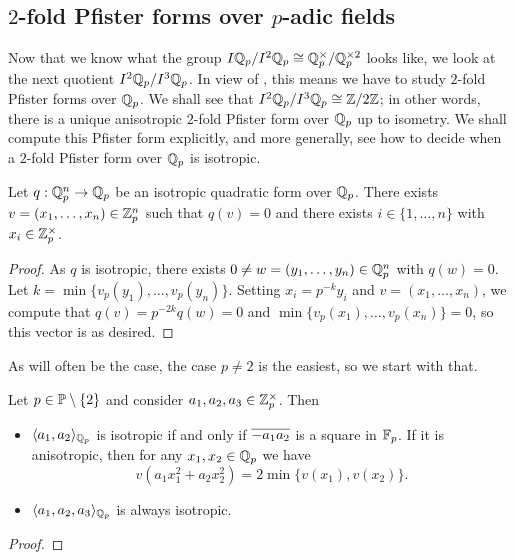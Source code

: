 \documentclass[12pt, leqno, british]{amsart}
\begin{document}
\subsection{$2$-fold Pfister forms over $p$-adic fields}
Now that we know what the group $I\mathbb Q_p/I^2\mathbb Q_p \cong \mathbb Q_p^\times/\mathbb Q_p^{\times 2}$ looks like, we look at the next quotient $I^2\mathbb Q_p/I^3\mathbb Q_p$.
In view of , this means we have to study $2$-fold Pfister forms over $\mathbb Q_p$.
We shall see that $I^2\mathbb Q_p/I^3\mathbb Q_p \cong \mathbb Z/2\mathbb Z$; in other words, there is a unique anisotropic $2$-fold Pfister form over $\mathbb Q_p$ up to isometry.
We shall compute this Pfister form explicitly, and more generally, see how to decide when a $2$-fold Pfister form over $\mathbb Q_p$ is isotropic.

\begin{lem}\label{L:isotropic-vector-in-zzp}
Let $q : \mathbb Q_p^n \to \mathbb Q_p$ be an isotropic quadratic form over $\mathbb Q_p$.
There exists $v = (x_1, \ldots, x_n) \in \mathbb Z_p^n$ such that $q(v) = 0$ and there exists $i \in \lbrace 1, \ldots, n \rbrace$ with $x_i \in \mathbb Z_p^\times$.
\end{lem}
\begin{proof}
As $q$ is isotropic, there exists $0 \neq w = (y_1, \ldots, y_n) \in \mathbb Q_p^n$ with $q(w) = 0$.
Let $k = \min \lbrace v_p(y_1), \ldots, v_p(y_n) \rbrace$.
Setting $x_i = p^{-k}y_i$ and $v = (x_1, \ldots, x_n)$, we compute that $q(v) = p^{-2k}q(w) = 0$ and $\min \lbrace v_p(x_1), \ldots, v_p(x_n) \rbrace = 0$, so this vector is as desired.
\end{proof}
As will often be the case, the case $p\neq 2$ is the easiest, so we start with that.
\begin{lem}
Let $p \in \mathbb P \setminus \lbrace 2 \rbrace$ and consider $a_1, a_2, a_3 \in \mathbb Z_p^\times$.
Then
\begin{itemize}
\item $\langle a_1, a_2 \rangle_{\mathbb Q_p}$ is isotropic if and only if $\overline{-a_1a_2}$ is a square in $\mathbb F_p$.
If it is anisotropic, then for any $x_1, x_2 \in \mathbb Q_p$ we have
\begin{displaymath}
v(a_1x_1^2 + a_2x_2^2) = 2\min \lbrace v(x_1), v(x_2) \rbrace.
\end{displaymath}
\item $\langle a_1, a_2, a_3 \rangle_{\mathbb Q_p}$ is always isotropic.
\end{itemize}
\end{lem}
\begin{proof}

\end{proof}
\end{document}
